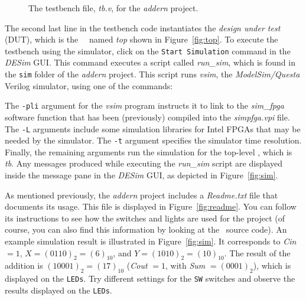 \begin{figure}[H]
\begin{center}
\begin{minipage}[t]{16.5 cm}
%	
	
\end{minipage}
	\caption{The testbench file, {\it tb.v}, for the {\it addern} project.}
	\label{fig:tb}
\end{center}
\end{figure}

The second last line in the testbench code instantiates the 
{\it design under test} (DUT), which is the \hdlName~\hdlModuleName~named {\it top} shown in 
Figure~\ref{fig:top}. To execute the testbench using the simulator, click on the
\texttt{Start Simulation} command in the {\it DESim} GUI. This command executes a script 
called {\it run\_sim}, which is found in the \texttt{sim} folder of the 
{\it addern} project. This script runs {\it vsim}, the {\it ModelSim/Questa} Verilog
simulator, using one of the commands:



The \texttt{-pli} argument for the {\it vsim} program instructs it to link to the
{\it sim\_fpga} software function that has been (previously) compiled into the 
{\it simpfga.vpi} file. The \texttt{-L} arguments include some simulation libraries for
Intel FPGAs that may be needed by the simulator. The \texttt{-t} argument specifies
the simulator time resolution. Finally, the remaining arguments 
run the simulation for the top-level \hdlModuleName, which is {\it tb}. Any messages 
produced while executing the {\it run\_sim} script are displayed inside the message pane in
the {\it DESim} GUI, as depicted in Figure~\ref{fig:sim}.

As mentioned previously, the {\it addern} project includes a {\it Readme.txt} file that
documents its usage. This file is displayed in Figure~\ref{fig:readme}. You can follow
its instructions to see how the switches and lights are used for the project (of course, 
you can also find this information by looking at the \hdlName~source code). An example
simulation result is illustrated in Figure~\ref{fig:sim}. It corresponds to {\it Cin} $= 1$,
$X = (0110)_2 = (6)_{10}$, and $Y = (1010)_2 = (10)_{10}$. The result of the addition is
$(10001)_2 = (17)_{10}$ ({\it Cout} $= 1$, with {\it Sum} $= (0001)_2$), which is displayed on 
the \texttt{LEDs}.  Try different settings for the
\texttt{SW} switches and observe the results displayed on the \texttt{LEDs}.


